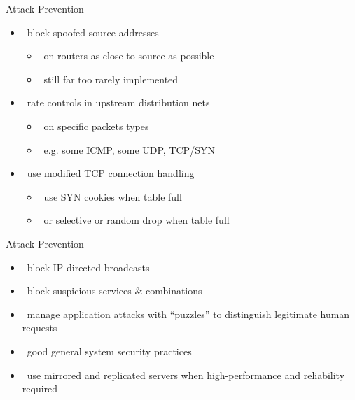 \documentclass{beamer}
\begin{document}
\begin{frame}{Attack Prevention }
  \begin{itemize}
  \item  block spoofed source addresses 
    \begin{itemize}
    \item  on routers as close to source as possible 
    \item  still far too rarely implemented 
    \end{itemize}
  \item  rate controls in upstream distribution nets 
    \begin{itemize}
    \item  on specific packets types 
    \item  e.g. some ICMP, some UDP, TCP/SYN 
    \end{itemize}
  \item  use modified TCP connection handling 
    \begin{itemize}
    \item  use SYN cookies when table full 
    \item  or selective or random drop when table full 
    \end{itemize}
  \end{itemize}
\end{frame}

\begin{frame}{Attack Prevention }
  \begin{itemize}
  \item  block IP directed broadcasts 
  \item  block suspicious services \& combinations 
  \item  manage application attacks with “puzzles” to 
    distinguish legitimate human requests 
  \item  good general system security practices 
  \item  use mirrored and replicated servers when 
    high-performance and reliability required
  \end{itemize}
\end{frame}
\end{document}

